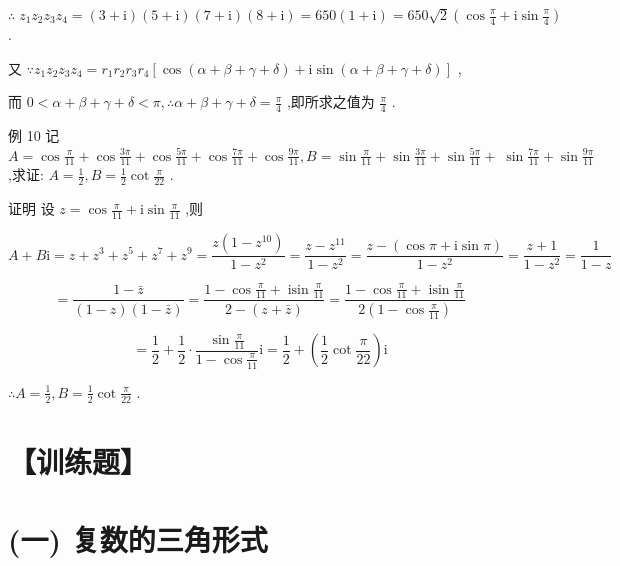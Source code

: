 \documentclass[10pt]{article}
\begin{document}
\(\therefore \;{z}_{1}{z}_{2}{z}_{3}{z}_{4} = \left( {3 + \mathrm{i}}\right) \left( {5 + \mathrm{i}}\right) \left( {7 + \mathrm{i}}\right) \left( {8 + \mathrm{i}}\right)  = {650}\left( {1 + \mathrm{i}}\right)  = {650}\sqrt{2}\left( {\cos \frac{\pi }{4} + \mathrm{i}\sin \frac{\pi }{4}}\right)\) .

又 \(\because {z}_{1}{z}_{2}{z}_{3}{z}_{4} = {r}_{1}{r}_{2}{r}_{3}{r}_{4}\left\lbrack  {\cos \left( {\alpha  + \beta  + \gamma  + \delta }\right)  + \mathrm{i}\sin \left( {\alpha  + \beta  + \gamma  + \delta }\right) }\right\rbrack\) ,

而 \(0 < \alpha  + \beta  + \gamma  + \delta  < \pi ,\therefore \alpha  + \beta  + \gamma  + \delta  = \frac{\pi }{4}\) ,即所求之值为 \(\frac{\pi }{4}\) .

例 10 记 \(A = \cos \frac{\pi }{11} + \cos \frac{3\pi }{11} + \cos \frac{5\pi }{11} + \cos \frac{7\pi }{11} + \cos \frac{9\pi }{11},B = \sin \frac{\pi }{11} + \sin \frac{3\pi }{11} + \sin \frac{5\pi }{11} + \; \sin \frac{7\pi }{11} + \sin \frac{9\pi }{11}\) ,求证: \(A = \frac{1}{2},B = \frac{1}{2}\cot \frac{\pi }{22}\) .

证明 设 \(z = \cos \frac{\pi }{11} + \mathrm{i}\sin \frac{\pi }{11}\) ,则

\[
A + B\mathrm{i} = z + {z}^{3} + {z}^{5} + {z}^{7} + {z}^{9} = \frac{z\left( {1 - {z}^{10}}\right) }{1 - {z}^{2}} = \frac{z - {z}^{11}}{1 - {z}^{2}} = \frac{z - \left( {\cos \pi  + \mathrm{i}\sin \pi }\right) }{1 - {z}^{2}} = \frac{z + 1}{1 - {z}^{2}} = \frac{1}{1 - z}
\]

\[
= \frac{1 - \bar{z}}{\left( {1 - z}\right) \left( {1 - \bar{z}}\right) } = \frac{1 - \cos \frac{\pi }{11} + \operatorname{isin}\frac{\pi }{11}}{2 - \left( {z + \bar{z}}\right) } = \frac{1 - \cos \frac{\pi }{11} + \operatorname{isin}\frac{\pi }{11}}{2\left( {1 - \cos \frac{\pi }{11}}\right) }
\]

\[
= \frac{1}{2} + \frac{1}{2} \cdot  \frac{\sin \frac{\pi }{11}}{1 - \cos \frac{\pi }{11}}\mathrm{i} = \frac{1}{2} + \left( {\frac{1}{2}\cot \frac{\pi }{22}}\right) \mathrm{i}
\]

\(\therefore A = \frac{1}{2},B = \frac{1}{2}\cot \frac{\pi }{22}\) .

\section*{【训练题】}

\section*{(一) 复数的三角形式}
\end{document}
